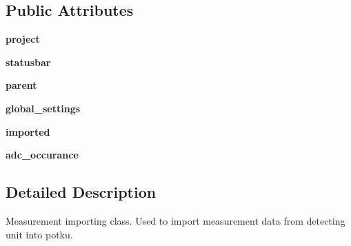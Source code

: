 \subsection*{Public Attributes}
\begin{DoxyCompactItemize}
\item 
\hypertarget{classDialogs_1_1ImportMeasurementDialog_1_1ImportMeasurementsDialog_af3f60ce8c50e9e868792b2c7d058d3df}{{\bfseries project}}\label{classDialogs_1_1ImportMeasurementDialog_1_1ImportMeasurementsDialog_af3f60ce8c50e9e868792b2c7d058d3df}

\item 
\hypertarget{classDialogs_1_1ImportMeasurementDialog_1_1ImportMeasurementsDialog_a6c8f9a9fd21d3af7290ff28870b46b7f}{{\bfseries statusbar}}\label{classDialogs_1_1ImportMeasurementDialog_1_1ImportMeasurementsDialog_a6c8f9a9fd21d3af7290ff28870b46b7f}

\item 
\hypertarget{classDialogs_1_1ImportMeasurementDialog_1_1ImportMeasurementsDialog_aeaedfe3cfa81f38c4474717e30add092}{{\bfseries parent}}\label{classDialogs_1_1ImportMeasurementDialog_1_1ImportMeasurementsDialog_aeaedfe3cfa81f38c4474717e30add092}

\item 
\hypertarget{classDialogs_1_1ImportMeasurementDialog_1_1ImportMeasurementsDialog_ac9c55bb602f2562a96c2001cc0466096}{{\bfseries global\-\_\-settings}}\label{classDialogs_1_1ImportMeasurementDialog_1_1ImportMeasurementsDialog_ac9c55bb602f2562a96c2001cc0466096}

\item 
\hypertarget{classDialogs_1_1ImportMeasurementDialog_1_1ImportMeasurementsDialog_aba577d94f9a5b1aa27e77e573a3e9562}{{\bfseries imported}}\label{classDialogs_1_1ImportMeasurementDialog_1_1ImportMeasurementsDialog_aba577d94f9a5b1aa27e77e573a3e9562}

\item 
\hypertarget{classDialogs_1_1ImportMeasurementDialog_1_1ImportMeasurementsDialog_adc386c27f53efe3fdbac4165e540872d}{{\bfseries adc\-\_\-occurance}}\label{classDialogs_1_1ImportMeasurementDialog_1_1ImportMeasurementsDialog_adc386c27f53efe3fdbac4165e540872d}

\end{DoxyCompactItemize}


\subsection{Detailed Description}
\begin{DoxyVerb}Measurement importing class. Used to import measurement data
from detecting unit into potku.
\end{DoxyVerb}
 


